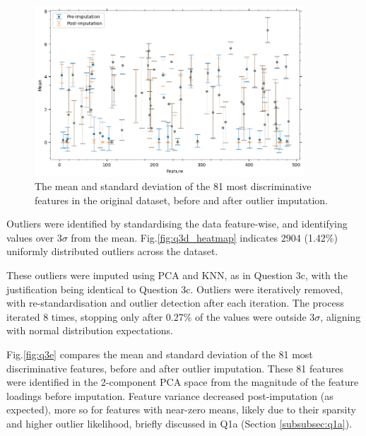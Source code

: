     \begin{figure}[htb]
    \centering
    \includegraphics[width=0.9\textwidth]{./figures/q3e}
    \caption{The mean and standard deviation of the 81 most discriminative features in the original
         dataset, before and after outlier imputation.}
    \label{fig:q3e}
    \end{figure}

    Outliers were identified by standardising the data feature-wise, and identifying values over $3\sigma$ from the mean.
    Fig.\eqref{fig:q3d_heatmap} indicates 2904 (1.42\%) uniformly distributed outliers across the dataset.

    These outliers were imputed using PCA and KNN, as in Question 3c, with the justification being identical to
    Question 3c.
    Outliers were iteratively removed, with re-standardisation and outlier detection after each iteration.
    The process iterated 8 times, stopping only after 0.27\% of the values were outside $3\sigma$, aligning with normal
    distribution expectations.

    Fig.\eqref{fig:q3e} compares the mean and standard deviation of the 81 most discriminative features, before and
    after outlier imputation.
    These 81 features were identified in the 2-component PCA space from the magnitude of the feature loadings before
    imputation.
    Feature variance decreased post-imputation (as expected), more so for features with near-zero means, likely due to
    their sparsity and higher outlier likelihood, briefly discussed in Q1a (Section \eqref{subsubsec:q1a}).

